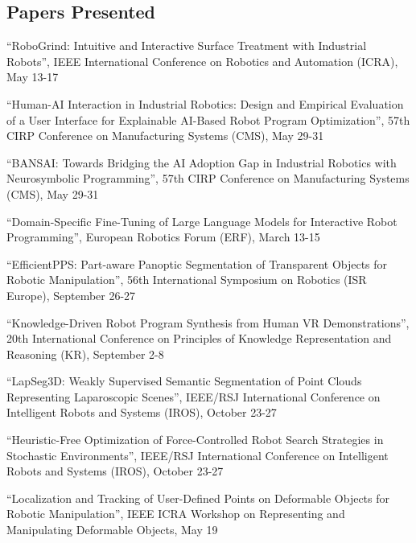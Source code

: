 \documentclass[11pt]{article} %
\begin{document}
\subsection*{Papers Presented}

``RoboGrind: Intuitive and Interactive Surface Treatment with Industrial Robots'', IEEE International Conference on Robotics and Automation (ICRA), May 13-17

\medskip

``Human-AI Interaction in Industrial Robotics: Design and Empirical Evaluation of a User Interface for Explainable AI-Based Robot Program Optimization'', 57th CIRP Conference on Manufacturing Systems (CMS), May 29-31

\medskip

``BANSAI: Towards Bridging the AI Adoption Gap in Industrial Robotics with Neurosymbolic Programming'', 57th CIRP Conference on Manufacturing Systems (CMS), May 29-31

\medskip

``Domain-Specific Fine-Tuning of Large Language Models for Interactive Robot Programming'', European Robotics Forum (ERF), March 13-15

\medskip


``EfficientPPS: Part-aware Panoptic Segmentation of Transparent Objects for Robotic Manipulation'', 56th International Symposium on Robotics (ISR Europe), September 26-27

\medskip

``Knowledge-Driven Robot Program Synthesis from Human VR Demonstrations'', 20th International Conference on Principles of Knowledge Representation and Reasoning (KR), September 2-8

\medskip


``LapSeg3D: Weakly Supervised Semantic Segmentation of Point Clouds Representing Laparoscopic Scenes'', IEEE/RSJ International Conference on Intelligent Robots and Systems (IROS), October 23-27

\medskip

``Heuristic-Free Optimization of Force-Controlled Robot Search Strategies in Stochastic Environments'', IEEE/RSJ International Conference on Intelligent Robots and Systems (IROS), October 23-27

\medskip

``Localization and Tracking of User-Defined Points on Deformable Objects for Robotic Manipulation'', IEEE ICRA Workshop on Representing and Manipulating Deformable Objects, May 19
\end{document}
